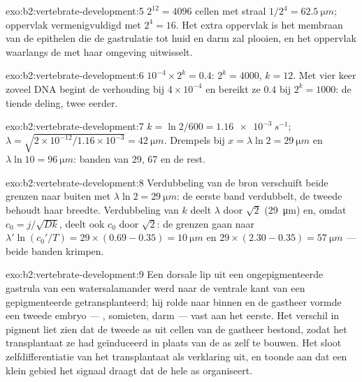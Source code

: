 \begin{solution}{exo:b2:vertebrate-development:5}
$2^{12} = 4096$ cellen met straal $1/2^{4} = \qty{62.5}{\micro m}$;
oppervlak vermenigvuldigd met $2^{4} = 16$. Het extra oppervlak is het
membraan van de epithelen die de gastrulatie tot huid en darm zal plooien,
en het oppervlak waarlangs de  met haar omgeving uitwisselt.
\end{solution}

\begin{solution}{exo:b2:vertebrate-development:6}
$10^{-4}\times 2^{k} = 0.4$: $2^{k} = 4000$, $k = 12$. Met vier keer
zoveel DNA begint de verhouding bij $4\times 10^{-4}$ en bereikt ze $0.4$
bij $2^{k} = 1000$: de tiende deling, twee eerder.
\end{solution}

\begin{solution}{exo:b2:vertebrate-development:7}
$k = \ln 2/600 = \qty{1.16e-3}{s^{-1}}$; $\lambda = \sqrt{2\times
10^{-12}/1.16\times 10^{-3}} = \qty{42}{\micro m}$. Drempels bij
$x = \lambda\ln 2 = \qty{29}{\micro m}$ en $\lambda\ln 10 =
\qty{96}{\micro m}$: banden van 29, 67 en de rest.
\end{solution}

\begin{solution}{exo:b2:vertebrate-development:8}
Verdubbeling van de bron verschuift beide grenzen naar buiten met $\lambda\ln
2 = \qty{29}{\micro m}$: de eerste band verdubbelt, de tweede behoudt
haar breedte. Verdubbeling van $k$ deelt $\lambda$ door $\sqrt 2$
(\qty{29}{\micro m}) en, omdat $c_0 = j/\sqrt{Dk}$, deelt ook $c_0$ door
$\sqrt 2$: de grenzen gaan naar $\lambda'\ln(c_0'/T) =
29\times(0.69 - 0.35) = \qty{10}{\micro m}$ en $29\times(2.30 -
0.35) = \qty{57}{\micro m}$ --- beide banden krimpen.
\end{solution}

\begin{solution}{exo:b2:vertebrate-development:9}
Een dorsale lip uit een ongepigmenteerde gastrula van een watersalamander
werd naar de ventrale kant van een gepigmenteerde getransplanteerd; hij
rolde naar binnen en de gastheer vormde een tweede embryo --- ,
somieten, darm --- vast aan het eerste. Het verschil in pigment liet zien
dat de tweede as uit cellen van de gastheer bestond, zodat het
transplantaat ze had geïnduceerd in plaats van de as zelf te bouwen. Het
sloot zelfdifferentiatie van het transplantaat als verklaring uit, en
toonde aan dat een klein gebied het signaal draagt dat de hele as
organiseert.
\end{solution}

